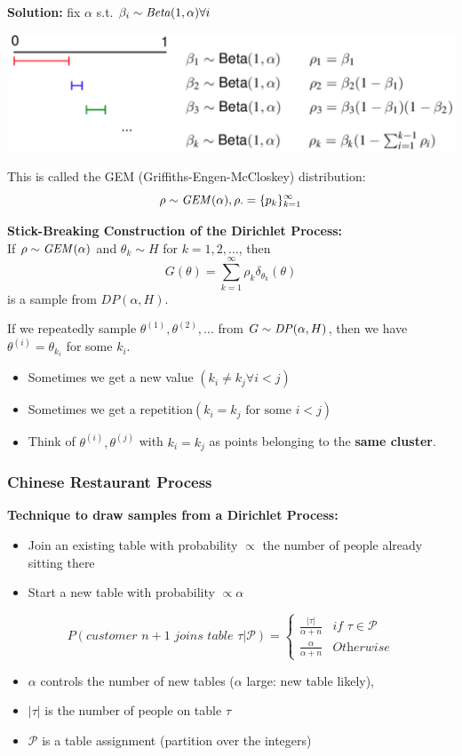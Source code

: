 \textbf{Solution: } fix $\alpha$ s.t. $\beta_i\sim \mathit{Beta}(1, \alpha) \forall i$
\begin{center}
	\includegraphics[width =  0.8\columnwidth]{images/12b-stick-breaking-2}
\end{center}

This is called the GEM (Griffiths-Engen-McCloskey) distribution: 
$$
	\rho\sim \mathit{GEM} (\alpha), \rho.= \{p_k\}_{k = 1}^\infty	
$$

\textbf{Stick-Breaking Construction of the Dirichlet Process: }\\
If $\rho\sim \mathit{GEM}(\alpha)$ and $\theta_k\sim H$ for $k = 1, 2, ...$, then 
$$
	G(\theta) = \sum_{k=1}^\infty\rho_k\delta_{\theta_k}(\theta)
$$
is a sample from $DP(\alpha, H).$

If we repeatedly sample $\theta^{(1)}, \theta^{(2)}, ...$ from $G\sim \mathit{DP}(\alpha, H)$, then we have $\theta^{(i)} = \theta_{k_i}$ for some $k_i$.
\begin{itemize}
	\item Sometimes we get a new value $(k_i\neq k_j \forall i<j)$
	\item Sometimes we get a repetition$(k_i =  k_j \text{ for some } i<j)$
	\item Think of $\theta^{(i)}, \theta^{(j)}$ with $k_i = k_j$ as points belonging to the \textbf{same cluster}.
\end{itemize} 

\subsubsection{Chinese Restaurant Process}
\textbf{Technique to draw samples from a Dirichlet Process: }
\begin{itemize}
	\item Join an existing table with probability $\propto$ the number of people already sitting there
	\item Start a new table with probability $\propto \alpha$
\end{itemize}
$$
	P(\textit{customer $n+1$ joins table $\tau$}|\mathcal P) = 
		\begin{cases}
			\frac{|\tau|}{\alpha + n} & \textit{if $\tau \in \mathcal P$} \\
			\frac{\alpha}{\alpha + n} & \textit{Otherwise}
		\end{cases}
$$
\begin{itemize}
	\item $\alpha$ controls the number of new tables ($\alpha$ large: new table likely), 
	\item $|\tau|$ is the number of people on table $\tau$
	\item $\mathcal P$ is a table assignment (partition over the integers)
\end{itemize}


